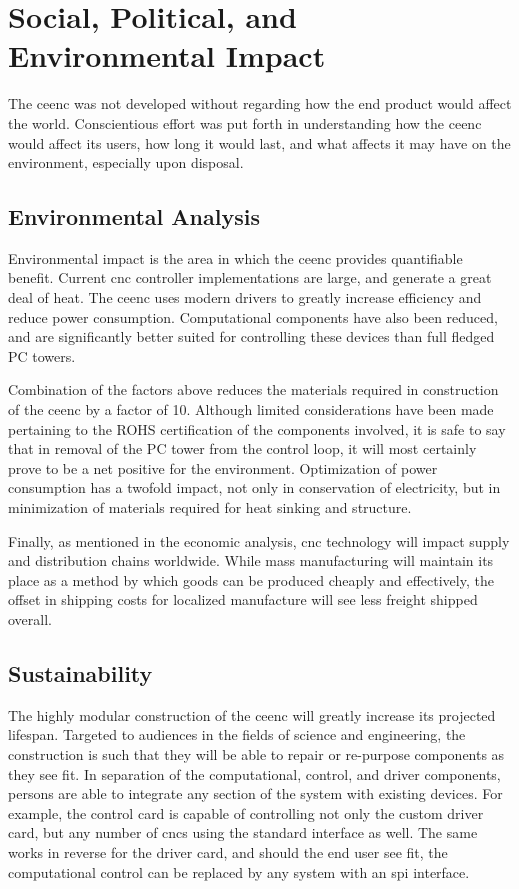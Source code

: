 \chapter{Social, Political, and Environmental Impact}

The \gls{ceenc} was not developed without regarding how the end product would affect the world.
Conscientious effort was put forth in understanding how the \gls{ceenc} would affect its users, how long it would last, and what affects it may have on the environment, especially upon disposal.

\section{Environmental Analysis}
Environmental impact is the area in which the \gls{ceenc} provides quantifiable benefit. 
Current \gls{cnc} controller implementations are large, and generate a great deal of heat. 
The \gls{ceenc} uses modern drivers to greatly increase efficiency and reduce power consumption. 
Computational components have also been reduced, and are significantly better suited for controlling these devices than full fledged PC towers. 

Combination of the factors above reduces the materials required in construction of the \gls{ceenc} by a factor of 10. 
Although limited considerations have been made pertaining to the ROHS certification of the components involved, it is safe to say that in removal of the PC tower from the control loop, it will most certainly prove to be a net positive for the environment. 
Optimization of power consumption has a twofold impact, not only in conservation of electricity, but in minimization of materials required for heat sinking and structure.

Finally, as mentioned in the economic analysis, \gls{cnc} technology will impact supply and distribution chains worldwide. \cite{3dprintsustain}
While mass manufacturing will maintain its place as a method by which goods can be produced cheaply and effectively, the offset in shipping costs for localized manufacture will see less freight shipped overall. \cite{3dprintenvironment}

\section{Sustainability}
The highly modular construction of the \gls{ceenc} will greatly increase its projected lifespan.
Targeted to audiences in the fields of science and engineering, the construction is such that they will be able to repair or re-purpose components as they see fit.
In separation of the computational, control, and driver components, persons are able to integrate any section of the system with existing devices.
For example, the control card is capable of controlling not only the custom driver card, but any number of \gls{cnc}s using the standard interface as well.
The same works in reverse for the driver card, and should the end user see fit, the computational control can be replaced by any system with an \gls{spi} interface.

